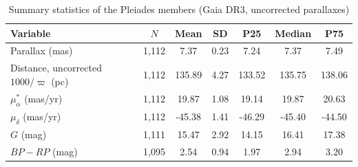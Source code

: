 \begin{table}[t]
\centering
\begin{threeparttable}
\caption{Summary statistics of the Pleiades members (Gaia DR3, uncorrected parallaxes)}
\label{tab:summary}
\begin{tabular}{lcccccc}
\toprule
Variable & $N$ & Mean & SD & P25 & Median & P75 \\
\midrule
Parallax (mas) & 1,112 & 7.37 & 0.23 & 7.24 & 7.37 & 7.49 \\
Distance, uncorrected $1000/\varpi$ (pc) & 1,112 & 135.89 & 4.27 & 133.52 & 135.75 & 138.06 \\
$\mu_\alpha^*$ (mas/yr) & 1,112 & 19.87 & 1.08 & 19.14 & 19.87 & 20.63 \\
$\mu_\delta$ (mas/yr) & 1,112 & -45.38 & 1.41 & -46.29 & -45.40 & -44.50 \\
$G$ (mag) & 1,111 & 15.47 & 2.92 & 14.15 & 16.41 & 17.38 \\
$BP-RP$ (mag) & 1,095 & 2.54 & 0.94 & 1.97 & 2.94 & 3.20 \\
\bottomrule
\end{tabular}
\end{threeparttable}
\end{table}
